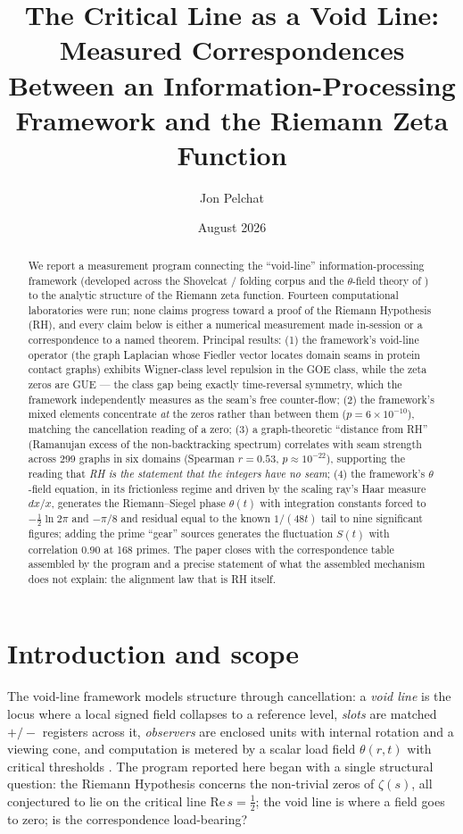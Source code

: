\documentclass[11pt]{article}
\title{\bf The Critical Line as a Void Line:\\ Measured Correspondences Between an Information-Processing\\ Framework and the Riemann Zeta Function}
\author{Jon Pelchat}
\date{August 2026}
\begin{document}
\maketitle

\begin{abstract}
We report a measurement program connecting the ``void-line'' information-processing framework
(developed across the Shovelcat / folding corpus and the $\theta$-field theory of
\cite{pelchat-theta}) to the analytic structure of the Riemann zeta function. Fourteen computational
laboratories were run; none claims progress toward a proof of the Riemann Hypothesis (RH), and every
claim below is either a numerical measurement made in-session or a correspondence to a named theorem.
Principal results: (1) the framework's void-line operator (the graph Laplacian whose Fiedler vector
locates domain seams in protein contact graphs) exhibits Wigner-class level repulsion in the GOE
class, while the zeta zeros are GUE --- the class gap being exactly time-reversal symmetry, which the
framework independently measures as the seam's free counter-flow; (2) the framework's mixed elements
concentrate \emph{at} the zeros rather than between them ($p=6\times10^{-10}$), matching the
cancellation reading of a zero; (3) a graph-theoretic ``distance from RH'' (Ramanujan excess of the
non-backtracking spectrum) correlates with seam strength across 299 graphs in six domains
(Spearman $r=0.53$, $p\approx10^{-22}$), supporting the reading that \emph{RH is the statement that
the integers have no seam}; (4) the framework's $\theta$-field equation, in its frictionless regime
and driven by the scaling ray's Haar measure $dx/x$, generates the Riemann--Siegel phase
$\theta(t)$ with integration constants forced to $-\tfrac12\ln 2\pi$ and $-\pi/8$ and residual equal
to the known $1/(48t)$ tail to nine significant figures; adding the prime ``gear'' sources generates
the fluctuation $S(t)$ with correlation $0.90$ at 168 primes. The paper closes with the
correspondence table assembled by the program and a precise statement of what the assembled
mechanism does not explain: the alignment law that is RH itself.
\end{abstract}

\section{Introduction and scope}

The void-line framework models structure through cancellation: a \emph{void line} is the locus where
a local signed field collapses to a reference level, \emph{slots} are matched $+/-$ registers across
it, \emph{observers} are enclosed units with internal rotation and a viewing cone, and computation is
metered by a scalar load field $\theta(r,t)$ with critical thresholds \cite{pelchat-theta}. The
program reported here began with a single structural question: the Riemann Hypothesis concerns the
non-trivial zeros of $\zeta(s)$, all conjectured to lie on the critical line
$\mathrm{Re}\,s=\tfrac12$; the void line is where a field goes to zero; is the correspondence
load-bearing?
\end{document}
